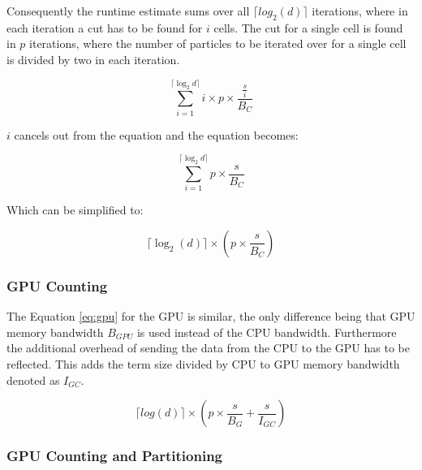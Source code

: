 \documentclass[]{article}
\begin{document}
Consequently the runtime estimate sums over all $\lceil log_2(d) \rceil$ iterations, where in each iteration a cut has to be found for $i$ cells. The cut for a single cell is found in $p$ iterations, where the number of particles to be iterated over for a single cell is divided by two in each iteration. 


\begin{center}
	\begin{equation}
		\sum_{i=1}^{\lceil \log_2{d} \rceil} i \times p \times  \frac{ \frac{s}{i}}{B_C} 
		\label{eq:cpu1}
	\end{equation}
\end{center}

$i$ cancels out from the equation and the equation becomes:

\begin{center}
	\begin{equation}
		\sum_{i=1}^{\lceil \log_2{d} \rceil} p \times \frac{s}{B_C} 
		\label{eq:cpu2}
	\end{equation}
\end{center}

Which can be simplified to:

\begin{center}
	\begin{equation}
		\lceil \log_2(d) \rceil  \times \left ( p \times \frac{ s }{B_{C}} \right )
		\label{eq:cpu}
	\end{equation}
\end{center}

\subsubsection{GPU Counting}


The Equation \ref{eq:gpu} for the GPU is similar, the only difference being that  GPU memory bandwidth $B_{GPU}$ is used instead of the CPU bandwidth. Furthermore the additional overhead of sending the data from the CPU to the GPU has to be reflected. This adds the term size divided by CPU to GPU memory bandwidth denoted as $I_{GC}$.

\begin{center}
	\begin{equation}
			\lceil log(d) \rceil \times \left ( p \times \frac{s}{B_{G}} +\frac{s}{I_{GC}} \right ) 
		\label{eq:gpu}
	\end{equation}
\end{center}


\subsubsection{GPU Counting and Partitioning}\label{gpu-tree-building}
\end{document}
